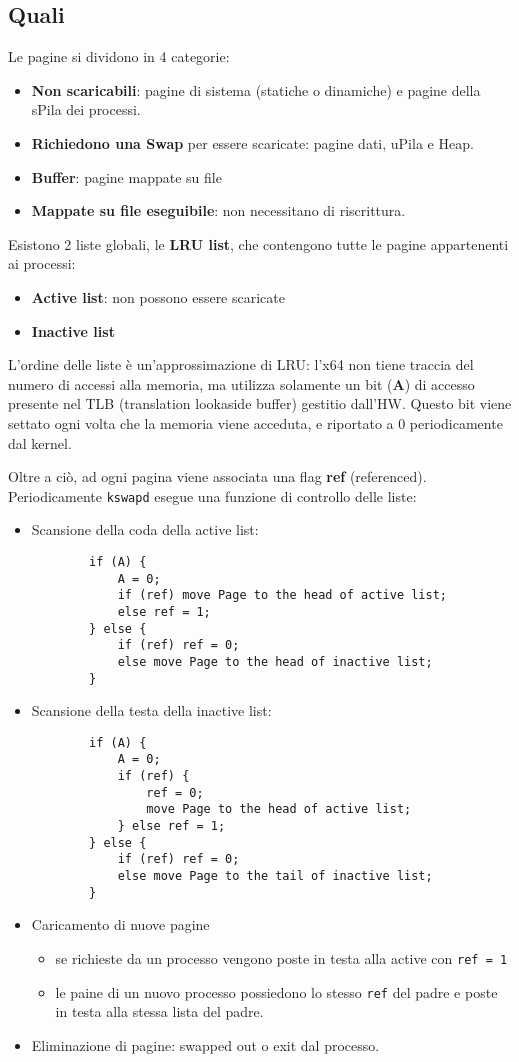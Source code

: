\documentclass[12pt, a4paper]{report}
\begin{document}
\subsection{Quali}
Le pagine si dividono in 4 categorie:
\begin{itemize}
	\item \textbf{Non scaricabili}: pagine di sistema (statiche o dinamiche) e
		pagine della sPila dei processi.
	\item \textbf{Richiedono una Swap} per essere scaricate: pagine dati, uPila
		e Heap.
	\item \textbf{Buffer}: pagine mappate su file
	\item \textbf{Mappate su file eseguibile}: non necessitano di riscrittura.
\end{itemize}
Esistono 2 liste globali, le \textbf{LRU list}, che contengono tutte le pagine
appartenenti ai processi:
\begin{itemize}
	\item \textbf{Active list}: non possono essere scaricate
	\item \textbf{Inactive list}
\end{itemize}
L'ordine delle liste è un'approssimazione di LRU: l'x64 non tiene traccia del
numero di accessi alla memoria, ma utilizza solamente un bit (\textbf{A}) di
accesso presente nel TLB (translation lookaside buffer) gestitio dall'HW. Questo
bit viene settato ogni volta che la memoria viene acceduta, e riportato a 0
periodicamente dal kernel.

Oltre a ciò, ad ogni pagina viene associata una flag \textbf{ref} (referenced).
Periodicamente \texttt{kswapd} esegue una funzione di controllo delle liste:
\begin{itemize}
	\item Scansione della coda della active list:
		\begin{verbatim}
		if (A) {
		    A = 0;
		    if (ref) move Page to the head of active list;
		    else ref = 1;
		} else {
		    if (ref) ref = 0;
		    else move Page to the head of inactive list;
		}
		\end{verbatim}
	\item Scansione della testa della inactive list:
		\begin{verbatim}
		if (A) {
		    A = 0;
		    if (ref) {
			    ref = 0;
				move Page to the head of active list;
			} else ref = 1;
		} else {
		    if (ref) ref = 0;
		    else move Page to the tail of inactive list;
		}
		\end{verbatim}
	\item Caricamento di nuove pagine
		\begin{itemize}
			\item se richieste da un processo vengono poste in testa alla active
				con \texttt{ref = 1}
			\item le paine di un nuovo processo possiedono lo stesso
				\texttt{ref} del padre e poste in testa alla stessa lista del
				padre.
		\end{itemize}
	\item Eliminazione di pagine: swapped out o exit dal processo.
\end{itemize}
\end{document}
